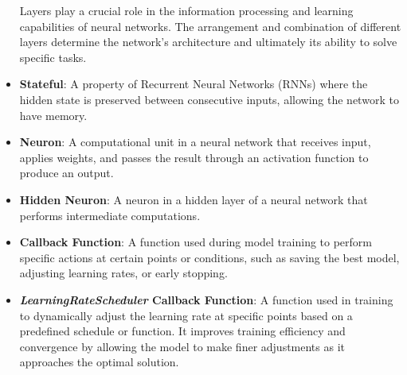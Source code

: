 \begin{itemize}
    Layers play a crucial role in the information processing and learning capabilities of neural networks. The arrangement and combination of different layers determine the network's architecture and ultimately its ability to solve specific tasks.
    
    \item \textbf{Stateful}: A property of Recurrent Neural Networks (RNNs) where the hidden state is preserved between consecutive inputs, allowing the network to have memory.
    
    \item \textbf{Neuron}: A computational unit in a neural network that receives input, applies weights, and passes the result through an activation function to produce an output.
    
    \item \textbf{Hidden Neuron}: A neuron in a hidden layer of a neural network that performs intermediate computations.
    
    \item \textbf{Callback Function}: A function used during model training to perform specific actions at certain points or conditions, such as saving the best model, adjusting learning rates, or early stopping.
    
    \item \textbf{\textit{LearningRateScheduler} Callback Function}: A function used in training to dynamically adjust the learning rate at specific points based on a predefined schedule or function. It improves training efficiency and convergence by allowing the model to make finer adjustments as it approaches the optimal solution.
\end{itemize}

